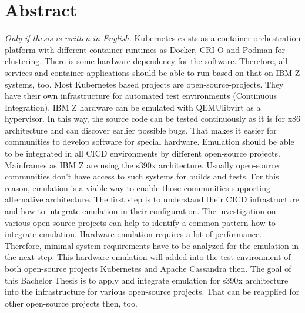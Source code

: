 \section*{Abstract}
\label{sec:abstract}
\emph{Only if thesis is written in English.}
Kubernetes exists as a container orchestration platform with different container runtimes as Docker, CRI-O and Podman for clustering. There is some hardware dependency for the software. Therefore, all services and container applications should be able to run based on that on IBM Z systems, too. Most Kubernetes based projects are open-source-projects. They have their own infrastructure for automated test environments (Continuous Integration). IBM Z hardware can be emulated with QEMU\/libvirt as a hypervisor. In this way, the source code can be tested continuously as it is for x86 architecture and can discover earlier possible bugs. That makes it easier for communities to develop software for special hardware. Emulation should be able to be integrated in all CI\/CD environments by different open-source projects. Mainframes as IBM Z are using the s390x architecture. Usually open-source communities don't have access to such systems for builds and tests. For this reason, emulation is a viable way to enable those communities supporting alternative architecture.
The first step is to understand their CI\/CD infrastructure and how to integrate emulation in their
configuration. The investigation on various open-source-projects can help to identify a common pattern how to integrate emulation. Hardware emulation requires a lot of performance. Therefore, minimal system requirements have to be analyzed for the emulation in the next step. This hardware emulation will added into the test environment of both open-source projects Kubernetes and Apache Cassandra then. The goal of this Bachelor Thesis is to apply and integrate emulation for s390x architecture into the infrastructure for various open-source projects. That can be reapplied for other open-source projects then, too. 


\blindtext

